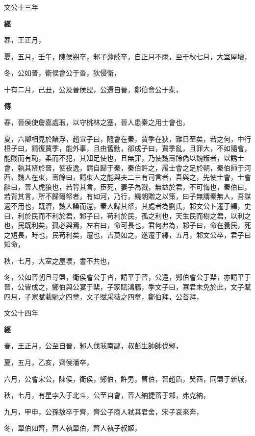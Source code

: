 \documentclass{ctexart}
\begin{document}
文公十三年


\textbf{經}



春，王正月，

夏，五月，壬午，陳侯朔卒，邾子蘧蒢卒，自正月不雨，至于秋七月，大室屋壞，

冬，公如晉，衛侯會公于沓，狄侵衛，

十有二月，己丑，公及晉侯盟，公還自晉，鄭伯會公于棐，

\textbf{傳}



春，晉侯使詹嘉處瑕，以守桃林之塞，晉人患秦之用士會也，

夏，六卿相見於諸浮，趙宣子曰，隨會在秦，賈季在狄，難日至矣，若之何，中行桓子曰，請復賈季，能外事，且由舊勳，郤成子曰，賈季亂，且罪大，不如隨會，能賤而有恥，柔而不犯，其知足使也，且無罪，乃使魏壽餘偽以魏叛者，以誘士會，執其帑於晉，使夜逸，請自歸于秦，秦伯許之，履士會之足於朝，秦伯師于河西，魏人在東，壽餘曰，請東人之能與夫二三有司言者，吾與之，先使士會，士會辭曰，晉人虎狼也，若背其言，臣死，妻子為戮，無益於君，不可悔也，秦伯曰，若背其言，所不歸爾帑者，有如河，乃行，繞朝贈之以策，曰子無謂秦無人，吾謀適不用也，既濟，魏人譟而還，秦人歸其帑，其處者為劉氏，邾文公卜遷于繹，史曰，利於民而不利於君，邾子曰，苟利於民，孤之利也，天生民而樹之君，以利之也，民既利矣，孤必與焉，左右曰，命可長也，君何弗為，邾子曰，命在養民，死之短長，時也，民苟利矣，遷也，吉莫如之，遂遷于繹，五月，邾文公卒，君子曰知命，

秋，七月，大室之屋壞，書不共也，

冬，公如晉朝且尋盟，衛侯會公于沓，請平于晉，公還，鄭伯會公于棐，亦請平于晉，公皆成之，鄭伯與公宴于棐，子家賦鴻鴈，季文子曰，寡君未免於此，文子賦四月，子家賦載馳之四章，文子賦采薇之四章，鄭伯拜，公荅拜，





文公十四年


\textbf{經}



春，王正月，公至自晉，邾人伐我南鄙，叔彭生帥帥伐邾，

夏，五月，乙亥，齊侯潘卒，

六月，公會宋公，陳侯，衛侯，鄭伯，許男，曹伯，晉趙盾，癸酉，同盟于新城，

秋，七月，有星孛入于北斗，公至自會，晉人納捷菑于邾，弗克納，

九月，甲申，公孫敖卒于齊，齊公子商人弒其君舍，宋子哀來奔，

冬，單伯如齊，齊人執單伯，齊人執子叔姬，
\end{document}
